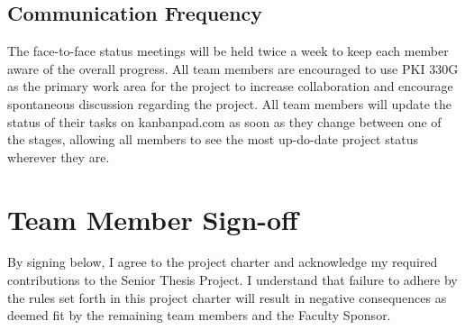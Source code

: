 \subsection{Communication Frequency}
The face-to-face status meetings will be held twice a week to keep each member aware of the overall progress.
All team members are encouraged to use PKI 330G as the primary work area for the project to increase collaboration and encourage spontaneous discussion regarding the project.
All team members will update the status of their tasks on kanbanpad.com as soon as they change between one of the stages, allowing all members to see the most up-do-date project status wherever they are.

\begin{minipage}{\textwidth}
\section{Team Member Sign-off}
By signing below, I agree to the project charter and acknowledge my required contributions to the Senior Thesis Project.
I understand that failure to adhere by the rules set forth in this project charter will result in negative consequences as deemed fit by the remaining team members and the Faculty Sponsor. 

\signatures
\end{minipage}
